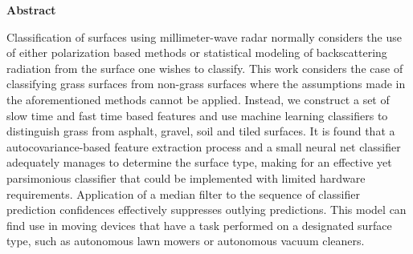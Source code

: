 \newenvironment{abstract}%
    {\cleardoublepage\thispagestyle{empty}\null\vfill\begin{center}%
    \bfseries{\textsf{Abstract}}\end{center}}%
    {\vfill\null}
\begin{abstract}
Classification of surfaces using millimeter-wave radar normally considers the use of either polarization based methods or statistical modeling of backscattering radiation from the surface one wishes to classify. This work considers the case of classifying grass surfaces from non-grass surfaces where the assumptions made in the aforementioned methods cannot be applied. Instead, we construct a set of slow time and fast time based features and use machine learning classifiers to distinguish grass from asphalt, gravel, soil and tiled surfaces. It is found that a autocovariance-based feature extraction process and a small neural net classifier adequately manages to determine the surface type, making for an effective yet parsimonious classifier that could be implemented with limited hardware requirements. Application of a median filter to the sequence of classifier prediction confidences effectively suppresses outlying predictions. This model can find use in moving devices that have a task performed on a designated surface type, such as autonomous lawn mowers or autonomous vacuum cleaners. 


\end{abstract}
